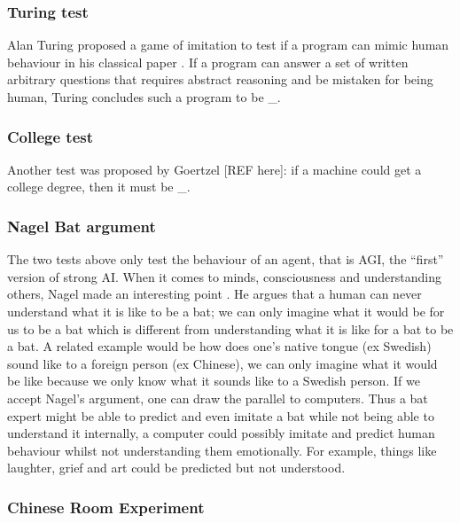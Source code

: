 \documentclass[11pt]{article}
\begin{document}
\subsubsection{Turing test}

Alan Turing proposed a game of imitation to test if a program can mimic human behaviour in his classical paper \cite{turing1950computing}. If a program can answer a set of written arbitrary questions that requires abstract reasoning and be mistaken for being human, Turing concludes such a program to be \_.

\subsubsection{College test}

Another test was proposed by Goertzel [REF here]: if a machine could get a college degree, then it must be \_.

\subsubsection{Nagel Bat argument}

The two tests above only test the behaviour of an agent, that is AGI, the “first” version of strong AI. When it comes to minds, consciousness and understanding others, Nagel made an interesting point \cite{nagel1974like}. He argues that a human can never understand what it is like to be a bat; we can only imagine what it would be for us to be a bat which is different from understanding what it is like for a bat to be a bat. A related example would be how does one’s native tongue (ex Swedish) sound like to a foreign person (ex Chinese), we can only imagine what it would be like because we only know what it sounds like to a Swedish person. If we accept Nagel’s argument, one can draw the parallel to computers. Thus a bat expert might be able to predict and even imitate a bat while not being able to understand it internally, a computer could possibly imitate and predict human behaviour whilst not understanding them emotionally. For example, things like laughter, grief and art could be predicted but not understood.

\subsubsection{Chinese Room Experiment}
\end{document}
